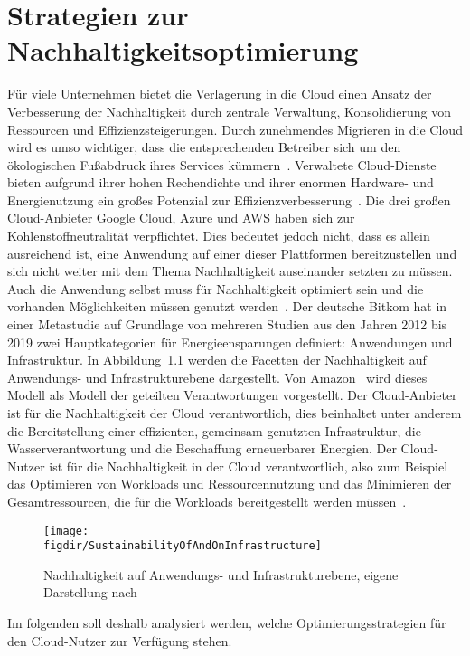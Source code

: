 \chapter{Strategien zur Nachhaltigkeitsoptimierung}\label{CAP:strategies}
Für viele Unternehmen bietet die Verlagerung in die Cloud einen Ansatz der Verbesserung der Nachhaltigkeit durch zentrale Verwaltung, Konsolidierung von Ressourcen und Effizienzsteigerungen.
Durch zunehmendes Migrieren in die Cloud wird es umso wichtiger, dass die entsprechenden Betreiber sich um den ökologischen Fußabdruck ihres Services kümmern~\cite{Buchanan.2023}.
Verwaltete Cloud-Dienste bieten aufgrund ihrer hohen Rechendichte und ihrer enormen Hardware- und Energienutzung ein großes Potenzial zur Effizienzverbesserung~\cite{Currie.2024}.
Die drei großen Cloud-Anbieter Google Cloud, Azure und AWS haben sich zur Kohlenstoffneutralität verpflichtet.
Dies bedeutet jedoch nicht, dass es allein ausreichend ist, eine Anwendung auf einer dieser Plattformen bereitzustellen und sich nicht weiter mit dem Thema Nachhaltigkeit auseinander setzten zu müssen.
Auch die Anwendung selbst muss für Nachhaltigkeit optimiert sein und die vorhanden Möglichkeiten müssen genutzt werden~\cite{Newman.2023}.
Der deutsche Bitkom hat in einer Metastudie auf Grundlage von mehreren Studien aus den Jahren 2012 bis 2019 zwei Hauptkategorien für Energieensparungen definiert: Anwendungen und Infrastruktur.
In Abbildung~\ref{FIG:sustainability-infrastructure} werden die Facetten der Nachhaltigkeit auf Anwendungs- und Infrastrukturebene dargestellt.
Von Amazon~\cite{Mokhtari.2023} wird dieses Modell als Modell der geteilten Verantwortungen vorgestellt.
Der Cloud-Anbieter ist für die Nachhaltigkeit der Cloud verantwortlich, dies beinhaltet unter anderem die Bereitstellung einer effizienten, gemeinsam genutzten Infrastruktur, die Wasserverantwortung und die Beschaffung erneuerbarer Energien.
Der Cloud-Nutzer ist für die Nachhaltigkeit in der Cloud verantwortlich, also zum Beispiel das Optimieren von Workloads und Ressourcennutzung und das Minimieren der Gesamtressourcen, die für die Workloads bereitgestellt werden müssen~\cite{Mokhtari.2023}.
\begin{figure}
 \caption{Nachhaltigkeit auf Anwendungs- und Infrastrukturebene, eigene Darstellung nach ~\cite{Mokhtari.2023}}
 {\texttt{[image: \\figdir/SustainabilityOfAndOnInfrastructure]}}
 \label{FIG:sustainability-infrastructure}
\end{figure}
Im folgenden soll deshalb analysiert werden, welche Optimierungsstrategien für den Cloud-Nutzer zur Verfügung stehen.


